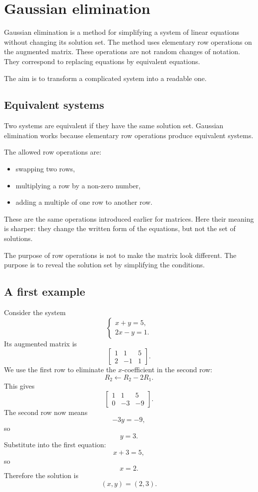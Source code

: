 \section{Gaussian elimination}

Gaussian elimination is a method for simplifying a system of linear equations without changing its solution set. The method uses elementary row operations on the augmented matrix. These operations are not random changes of notation. They correspond to replacing equations by equivalent equations.

The aim is to transform a complicated system into a readable one.

\subsection*{Equivalent systems}

Two systems are equivalent if they have the same solution set. Gaussian elimination works because elementary row operations produce equivalent systems.

The allowed row operations are:
\begin{itemize}
\item swapping two rows,
\item multiplying a row by a non-zero number,
\item adding a multiple of one row to another row.
\end{itemize}

These are the same operations introduced earlier for matrices. Here their meaning is sharper: they change the written form of the equations, but not the set of solutions.

\begin{remarkbox}
The purpose of row operations is not to make the matrix look different. The purpose is to reveal the solution set by simplifying the conditions.
\end{remarkbox}

\subsection*{A first example}

Consider the system
\[
\begin{cases}
x+y=5,\\
2x-y=1.
\end{cases}
\]
Its augmented matrix is
\[
\left[
\begin{array}{cc|c}
1&1&5\\
2&-1&1
\end{array}
\right].
\]
We use the first row to eliminate the \(x\)-coefficient in the second row:
\[
R_2\leftarrow R_2-2R_1.
\]
This gives
\[
\left[
\begin{array}{cc|c}
1&1&5\\
0&-3&-9
\end{array}
\right].
\]
The second row now means
\[
-3y=-9,
\]
so
\[
y=3.
\]
Substitute into the first equation:
\[
x+3=5,
\]
so
\[
x=2.
\]
Therefore the solution is
\[
(x,y)=(2,3).
\]


